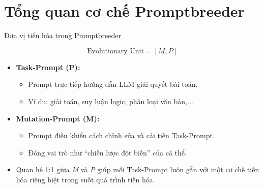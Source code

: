 \documentclass[english,main=vietnamese,xcolor=table]{beamer}
\begin{document}
\section{Tổng quan cơ chế Promptbreeder}
\begin{frame}{Đơn vị tiến hóa trong Promptbreeder}

\begin{center}
\[
\text{Evolutionary Unit} = [M, P]
\]
\end{center}

\begin{itemize}
    \setlength{\itemsep}{10pt}

    \item \textbf{Task-Prompt (P):}
    \begin{itemize}
        \item Prompt trực tiếp hướng dẫn LLM giải quyết bài toán.
        \item Ví dụ: giải toán, suy luận logic, phân loại văn bản,...
    \end{itemize}

    \item \textbf{Mutation-Prompt (M):}
    \begin{itemize}
        \item Prompt điều khiển cách chỉnh sửa và cải tiến Task-Prompt.
        \item Đóng vai trò như ``chiến lược đột biến'' của cá thể.
    \end{itemize}

    \item Quan hệ 1:1 giữa \textit{M} và \textit{P} giúp mỗi Task-Prompt luôn gắn với một cơ chế tiến hóa riêng biệt trong suốt quá trình tiến hóa.

\end{itemize}

\end{frame}
\end{document}
